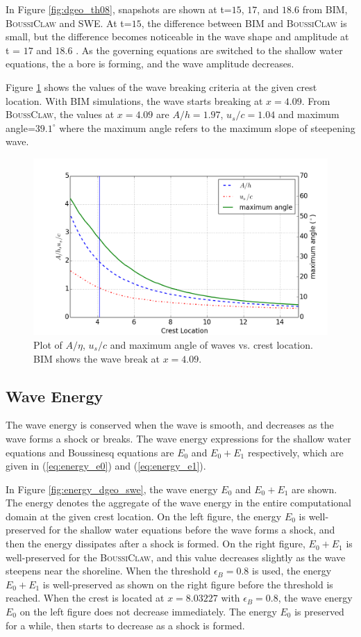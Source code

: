 \documentclass[review]{elsarticle}
\begin{document}
In Figure \ref{fig:dgeo_th08}, snapshots are shown at 
t=$15$, $17$, and $18.6$ from BIM, \textsc{BoussiClaw} 
and SWE.
At t=$15$, the difference between BIM and \textsc{BoussiClaw}
is small, but the difference becomes noticeable 
in the wave shape and amplitude at t = $17$ and $18.6$ . 
As the governing equations are switched to the shallow water equations,
the a bore is forming, and the wave amplitude decreases.

Figure \ref{fig:wave_break_criteria} shows 
the values of the wave breaking criteria at the given crest location. 
With BIM simulations, the wave starts breaking at $x=4.09$. 
From \textsc{BoussClaw}, the values at $x=4.09$ are
$A/h=1.97$, $u_s/c=1.04$ and maximum angle=$39.1^\circ$
where the maximum angle refers to 
the maximum slope of steepening wave.

\begin{figure}[!htb]
\centering
\includegraphics[width=.7\textwidth]{_fig/wave_break}
\caption{Plot of $A/\eta$, $u_s/c$ and maximum angle of waves vs. crest location. 
BIM shows the wave break at $x=4.09$. }
\label{fig:wave_break_criteria}
\end{figure}

\subsection{Wave Energy}

The wave energy is conserved when the wave is smooth, 
and decreases as the wave forms a shock or breaks.
The wave energy expressions 
for the shallow water equations and Boussinesq equations
are $E_0$ and $E_0+E_1$  respectively, 
which are given in (\ref{eq:energy_e0}) and (\ref{eq:energy_e1}). 

In Figure \ref{fig:energy_dgeo_swe}, 
the wave energy $E_0$ and $E_0+E_1$ are shown. 
The energy denotes the aggregate 
of the wave energy in the entire computational domain 
at the given crest location.
On the left figure, 
the energy $E_0$ is well-preserved 
for the shallow water equations 
before the wave forms a shock,
and then the energy dissipates after a shock is formed.
On the right figure, 
$E_0+E_1$ is well-preserved for the \textsc{BoussiClaw},
and this value decreases slightly as the wave steepens
near the shoreline.
When the threshold $\epsilon_B=0.8$ is used,
the energy $E_0+E_1$ is well-preserved 
as shown on the right figure before the threshold is reached. 
When the crest is located
at $x=8.03227$ with $\epsilon_B=0.8$, 
the wave energy $E_0$ on the left figure 
does not decrease immediately.
The energy $E_0$ is preserved for a while, 
then starts to decrease as a shock is formed. 
\end{document}
